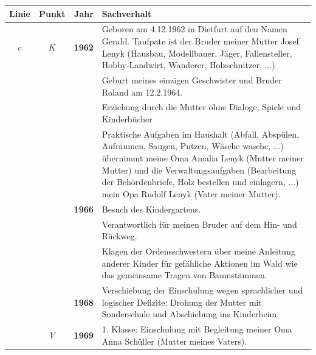 \documentclass[10pt,a4paper]{article}
\begin{document}

\begin{minipage}{\textwidth}
  \begin{tabularx}{\textwidth}{c|c|r|L@{}}
  \toprule
  Linie & Punkt & Jahr & Sachverhalt \\
  \midrule
  $c$   & $K$ & {\bf 1962} & Geboren am 4.12.1962 in Dietfurt auf den Namen
                             Gerald. Taufpate ist der
                             Bruder meiner Mutter Josef Lenyk (Hausbau, Modellbauer,
                             Jäger, Fallensteller, Hobby-Landwirt, Wanderer,
                             Holzschnitzer, $\ldots$) \\
        &     &            & Geburt meines einzigen Geschwister und Bruder
                             Roland am 12.2.1964. \\
        &     &            & Erziehung durch die Mutter ohne Dialoge, Spiele und
                             Kinderbücher \\
        &     &            & Praktische Aufgaben im Haushalt (Abfall, Abspülen,
                             Aufräumen, Saugen, Putzen, Wäsche wasche, $\ldots$)
                             übernimmt meine Oma Amalia Lenyk (Mutter meiner Mutter)
                             und die Verwaltungsaufgaben (Bearbeitung
                             der Behördenbriefe, Holz bestellen und einlagern,
                             $\ldots$) mein Opa Rudolf Lenyk (Vater meiner Mutter). \\
        &     & {\bf 1966} & Besuch des Kindergartens. \\
        &     &            & Verantwortlich für meinen Bruder auf dem Hin- und Rückweg. \\
        &     &            & Klagen der Ordensschwestern über meine Anleitung
                             anderer Kinder für
                             gefähliche Aktionen im Wald wie das gemeinsame
                             Tragen von Baumstämmen. \\
        &     & {\bf 1968} & Verschiebung der Einschulung wegen sprachlicher
                             und logischer Defizite: Drohung der Mutter mit
                             Sonderschule und Abschiebung ins Kinderheim. \\
  \midrule
        & $V$ & {\bf 1969} & 1. Klasse: Einschulung mit Begleitung meiner Oma Anna
                             Schüller (Mutter meines Vaters). \\

\end{tabularx}
\end{minipage}
\end{document}
